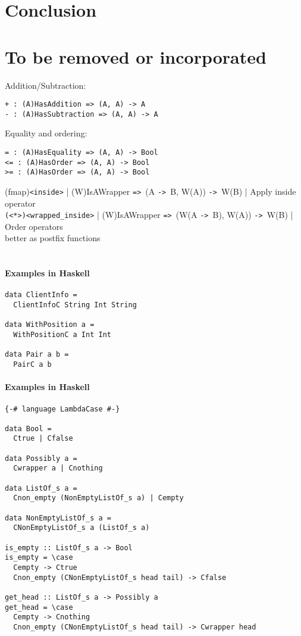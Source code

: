 \documentclass{article}
\def\H{Haskell}
\def\ra{\texttt{->}\ }
\def\Ra{\texttt{=>}\ }
\begin{document}
\section{Conclusion}

\section{To be removed or incorporated}

Addition/Subtraction:
\begin{verbatim}
+ : (A)HasAddition => (A, A) -> A
- : (A)HasSubtraction => (A, A) -> A
\end{verbatim}
Equality and ordering:
\begin{verbatim}
= : (A)HasEquality => (A, A) -> Bool
<= : (A)HasOrder => (A, A) -> Bool
>= : (A)HasOrder => (A, A) -> Bool
\end{verbatim}

(fmap)\texttt{<inside>} | (W)IsAWrapper \Ra (A \ra B, W(A)) \ra W(B) | Apply inside operator \\
\texttt{(<*>)<wrapped_inside>} | (W)IsAWrapper \Ra (W(A \ra B), W(A)) \ra W(B) | Order operators \\

better as postfix functions \\
\hspace{1cm}\\
\paragraph{Examples in \H}

\begin{verbatim}
data ClientInfo =
  ClientInfoC String Int String

data WithPosition a = 
  WithPositionC a Int Int

data Pair a b = 
  PairC a b
\end{verbatim}

\paragraph{Examples in \H}

\begin{verbatim}
{-# language LambdaCase #-}

data Bool =
  Ctrue | Cfalse

data Possibly a =
  Cwrapper a | Cnothing

data ListOf_s a =
  Cnon_empty (NonEmptyListOf_s a) | Cempty

data NonEmptyListOf_s a =
  CNonEmptyListOf_s a (ListOf_s a)

is_empty :: ListOf_s a -> Bool
is_empty = \case
  Cempty -> Ctrue
  Cnon_empty (CNonEmptyListOf_s head tail) -> Cfalse

get_head :: ListOf_s a -> Possibly a
get_head = \case
  Cempty -> Cnothing
  Cnon_empty (CNonEmptyListOf_s head tail) -> Cwrapper head
\end{verbatim}
\end{document}
